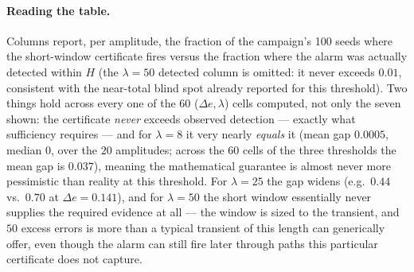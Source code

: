 \documentclass[10pt,a4paper]{article}
\begin{document}
\paragraph{Reading the table.} Columns report, per amplitude, the fraction of the
campaign's 100 seeds where the short-window certificate fires versus the fraction where
the alarm was actually detected within $H$ (the $\lambda=50$ detected column is
omitted: it never exceeds $0.01$, consistent with the near-total blind spot already
reported for this threshold). Two things hold across every one of the $60$
($\Delta e,\lambda$) cells computed, not only the seven shown: the certificate
\emph{never} exceeds observed detection --- exactly what sufficiency requires --- and
for $\lambda = 8$ it very nearly \emph{equals} it (mean gap $0.0005$, median $0$, over
the $20$ amplitudes; across the $60$ cells of the three thresholds the mean gap is
$0.037$), meaning the mathematical guarantee is almost never more pessimistic than
reality at this threshold. For $\lambda = 25$ the gap widens (e.g.\ $0.44$ vs.\ $0.70$
at $\Delta e = 0.141$), and for $\lambda = 50$ the short window essentially never
supplies the required evidence at all --- the window is sized to the transient, and
$50$ excess errors is more than a typical transient of this length can generically
offer, even though the alarm can still fire later through paths this particular
certificate does not capture.
\end{document}
